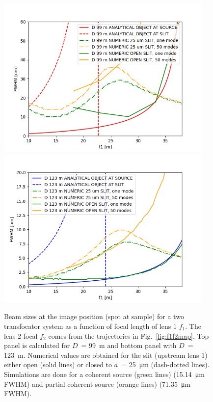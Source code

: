 \documentclass{iucr}              %
\newcommand{\inblue}[1]{{\color{blue}#1}}
\newcommand{\inred}[1]{{\color{red}#1}}
\newcommand{\ingreen}[1]{{\color{green}#1}}
\begin{document}
\begin{figure}
    \centering
    \includegraphics[width=0.95\textwidth]{figures/Figure_sizes_99.png}
    \includegraphics[width=0.95\textwidth]{figures/Figure_sizes_123.png}
    \caption{Beam sizes at the image position (spot at sample) for a two transfocator system as a function of focal length of lens 1 $f_1$. The lens 2 focal $f_2$ comes from the trajectories in Fig.~\ref{fig:f1f2map}.
    Top panel is calculated for \inred{$D$~= \SI{99}{\meter}} and bottom panel with \inblue{$D$~= \SI{123}{\meter}}.
    Numerical values are obtained for the slit (upstream lens 1) either open (solid lines) or closed to $a$~= \SI{25}{\micro\meter} (dash-dotted lines). Simulations are done for a \ingreen{coherent source (green lines)} (\SI{15.14}{\micro\meter} FWHM) and partial coherent source (orange lines) (\SI{71.35}{\micro\meter} FWHM).
    }
    \label{fig:sizes}
\end{figure}
\end{document}
